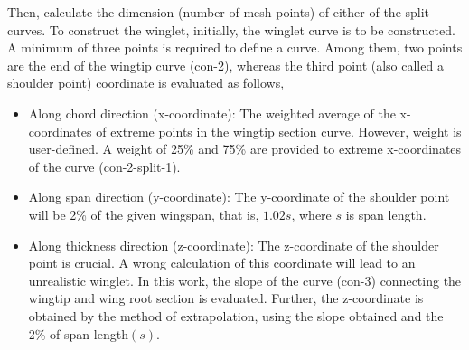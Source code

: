 Then, calculate the dimension (number of mesh points) of either of the split curves. To construct the winglet, initially, the winglet curve is to be constructed. A minimum of three points is required to define a curve. Among them, two points are the end of the wingtip curve (con-2), whereas the third point (also called a shoulder point) coordinate is evaluated as follows,
\begin{itemize}
\item Along chord direction (x-coordinate): The weighted average of the x-coordinates of extreme points in the wingtip section curve. However, weight is user-defined. A weight of 25\% and 75\% are provided to extreme x-coordinates of the curve (con-2-split-1).
\item  Along span direction (y-coordinate): The y-coordinate of the shoulder point will be 2\% of the given wingspan, that is, $1.02s$, where $s$ is span length.
\item Along thickness direction (z-coordinate): The z-coordinate of the shoulder point is crucial. A wrong calculation of this coordinate will lead to an unrealistic winglet. In this work, the slope of the curve (con-3) connecting the wingtip and wing root section is evaluated. Further, the z-coordinate is obtained by the method of extrapolation, using the slope obtained and the 2\% of span length$(s)$.
\end{itemize}

